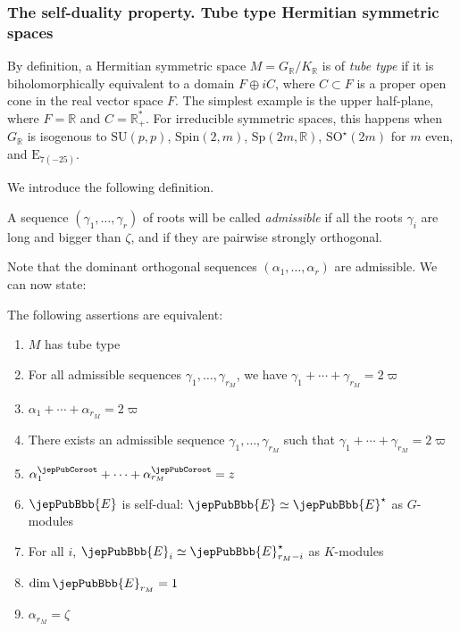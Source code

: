 \subsubsection{The self-duality property. Tube type Hermitian symmetric spaces}
By definition, a Hermitian symmetric space $M=G_{\mathbb R}/K_{\mathbb R}$ is of \emph{tube type} if it is biholomorphically equivalent to a domain $F\oplus iC$, where $C\subset F$ is a proper open cone in the real vector space $F$. The simplest example is the upper half-plane, where $F=\mathbb R$ and $C=\mathbb R^*_+$. For irreducible symmetric spaces, this happens when $G_{\mathbb R}$ is isogenous to $\mathrm{SU}(p,p)$, $\mathrm{Spin}(2,m)$, $\mathrm{Sp}(2m,\mathbb R)$, $\mathrm{SO}^{\star}(2m)$ for $m$ even, and $\mathrm E_{7(-25)}$.

We introduce the following definition.
\begin{definition}
A sequence $(\gamma_1,\ldots,\gamma_r)$ of roots will be called \emph{admissible} if all the roots $\gamma_i$ are long and bigger than $\zeta$, and if they are pairwise strongly orthogonal.
\end{definition}
Note that the dominant orthogonal sequences $(\alpha_1,\ldots,\alpha_r)$ are admissible. We can now state:
\begin{proposition}
The following assertions are equivalent:
\begin{enumerate}[label=(\arabic*)]
\item $M$ has tube type
\item For all admissible sequences $\gamma_1,\ldots,\gamma_{r_M}$, we have $\gamma_1+\cdots+\gamma_{r_M}=2\varpi$
\item $\alpha_1+\cdots+\alpha_{r_M}=2\varpi$
\item There exists an admissible sequence $\gamma_1,\ldots,\gamma_{r_M}$ such that $\gamma_1+\cdots+\gamma_{r_M}=2\varpi$
\item $\alpha_1^\jepPubCoroot+\cdots+\alpha_{r_M}^\jepPubCoroot=z$
\item $\jepPubBbb{E}$ is self-dual: $\jepPubBbb{E}\simeq\jepPubBbb{E}^{\star}$ as $G$-modules
\item For all $i$, $\jepPubBbb{E}_i\simeq\jepPubBbb{E}_{r_M-i}^{\star}$ as $K$-modules
\item $\dim\jepPubBbb{E}_{r_M}=1$
\item $\alpha_{r_M}=\zeta$
\end{enumerate}
\end{proposition}
